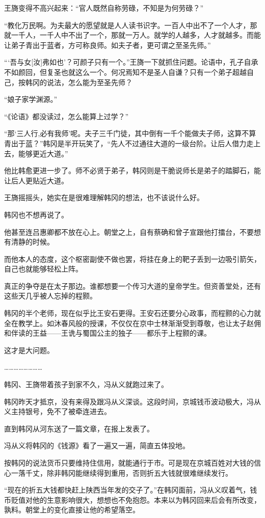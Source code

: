 王旖变得不高兴起来：“官人既然自称劳碌，不知是为何劳碌？”

“教化万民啊。为夫最大的愿望就是人人读书识字。一百人中出不了一个人才，那就一千人，一千人中不出了一个，那就一万人。就学的人越多，人才就越多。而能让弟子青出于蓝者，方可称良师。如夫子者，更可谓之至圣先师。”

“‘吾与女[汝]弗如也’？可颜子只有一个。”王旖一下就抓住问题。论语中，孔子自承不如颜回，但复圣也就这么一个。何况焉知不是圣人自谦？只有一个弟子超越自己，按韩冈的说法，怎么能为至圣先师？

“娘子家学渊源。”

“《论语》都没读过，怎么能算上过学？”

“那‘三人行,必有我师’呢。夫子三千门徒，其中倒有一千个能做夫子师，这算不算青出于蓝？”韩冈是半开玩笑了，“先人不过通往大道的一级台阶。让后人借力走上去，能够更近大道。”

他比韩愈更进一步了。师不必贤于弟子，韩冈则是干脆说师长是弟子的踏脚石，能让后人更贴近大道。

王旖摇摇头，她实在是很难理解韩冈的想法，也不该说什么好。

韩冈也不想再说了。

他甚至连吕惠卿都不放在心上。朝堂之上，自有蔡确和曾子宣跟他打擂台，不要想有清静的时候。

而他本人的态度，这个枢密副使不做也罢，将挂在身上的靶子丢到一边吸引箭矢，自己也就能够轻松上阵。

真正的争夺是在太子那边。谁都想要一个传习大道的皇帝学生。但资善堂处，还有这些天几乎被人忘掉的程颢。

韩冈的半个老师，现在似乎比王安石更得。王安石还要分心政事，而程颢的心力就全在教学上。如沐春风般的授课，不仅仅在京中士林渐渐受到尊敬，也让太子赵佣和伴读的王益——王诜与蜀国公主的独子——都乐于上程颢的课。

这才是大问题。

……………………

韩冈、王旖带着孩子到家不久，冯从义就跑过来了。

韩冈昨天才抵京，没有来得及跟冯从义深谈。这段时间，京城钱币波动极大，冯从义主持银号，免不了被牵连进去。

直到韩冈从河东送了一篇文章，在报上发表了。

冯从义将韩冈的《钱源》看了一遍又一遍，简直五体投地。

按韩冈的说法货币只要维持住信用，就能通行于市。可是现在京城百姓对大钱的信心一落千丈，除非韩冈能继续得到重用，否则折五大钱就很难继续发行。

“现在的折五大钱都快赶上陕西当年发的交子了。”在韩冈面前，冯从义叹着气，钱币贬值对他的生意影响很大，想想也不免抱怨。本来以为韩冈回来后会有所改变，孰料。朝堂上的变化直接让他的希望落空。

